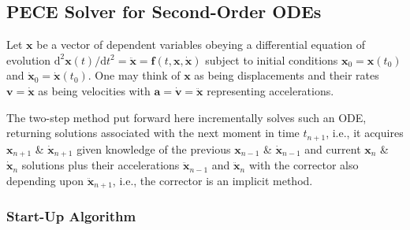 \subsection{PECE Solver for Second-Order ODEs}
\label{sec:2ndOrderPECE}

Let $\mathbf{x}$ be a vector of dependent variables obeying a differential equation of evolution $\mathrm{d}^2 \mathbf{x}(t) / \mathrm{d} t^2 = \ddot{\mathbf{x}} = \mathbf{f} (t, \mathbf{x}, \dot{\mathbf{x}})$ subject to initial conditions $\mathbf{x}_0 = \mathbf{x}(t_0)$ and $\dot{\mathbf{x}}_0 = \dot{\mathbf{x}}(t_0)$.  One may think of $\mathbf{x}$ as being displacements and their rates $\mathbf{v} = \dot{\mathbf{x}}$ as being velocities with $\mathbf{a} = \dot{\mathbf{v}} = \ddot{\mathbf{x}}$ representing accelerations. 

The two-step method put forward here incrementally solves such an ODE, returning solutions associated with the next moment in time $t_{n+1}$, i.e., it acquires $\mathbf{x}_{n+1}$ \& $\dot{\mathbf{x}}_{n+1}$ given knowledge of the previous $\mathbf{x}_{n-1}$ \& $\dot{\mathbf{x}}_{n-1}$ and current $\mathbf{x}_n$ \& $\dot{\mathbf{x}}_n$ solutions plus their accelerations $\ddot{\mathbf{x}}_{n-1}$ and $\ddot{\mathbf{x}}_n$ with the corrector also depending upon $\ddot{\mathbf{x}}_{n+1}$, i.e., the corrector is an implicit method.

\subsubsection{Start-Up Algorithm}

